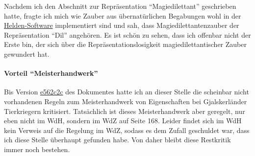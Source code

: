 Nachdem ich den Abschnitt zur Repräsentation \enquote{Magiedilettant} geschrieben hatte, fragte ich mich wie Zauber aus übernatürlichen Begabungen wohl in der \href{http://www.helden-software.de/}{Helden-Software} implementiert sind und sah, dass Magiedilettantenzauber der Repräsentation \enquote{Dil} angehören. Es ist schön zu sehen, dass ich offenbar nicht der Erste bin, der sich über die Repräsentationslosigkeit magiedilettantischer Zauber gewundert hat.

\paragraph{Vorteil \enquote{Meisterhandwerk}}
Bis Version \href{https://github.com/kreuvf/dsa-regeln-viertelzauberer/tree/e562c2c526ef68cc7c8058f152e65a53935a8aa2}{e562c2c} des Dokumentes hatte ich an dieser Stelle die scheinbar nicht vorhandenen Regeln zum Meisterhandwerk von Eigenschaften bei Gjalskerländer Tierkriegern kritisiert. Tatsächlich ist dieses Meisterhandwerk aber geregelt, nur eben nicht im WdH, sondern im WdZ auf Seite 168. Leider findet sich im WdH kein Verweis auf die Regelung im WdZ, sodass es dem Zufall geschuldet war, dass ich diese Stelle überhaupt gefunden habe. Von daher bleibt diese Restkritik immer noch bestehen.
